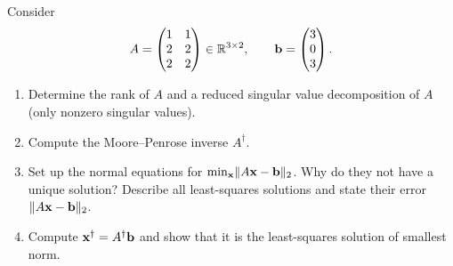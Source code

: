 
\renewcommand{\examletter}{D}

\makeheader

Consider
\[
A=\begin{pmatrix}1&1\\2&2\\2&2\end{pmatrix}\in\mathbb{R}^{3\times2},\qquad \mathbf{b}=\begin{pmatrix}3\\0\\3\end{pmatrix}.
\]
\begin{enumerate}
\item Determine the rank of $A$ and a reduced singular value decomposition of $A$ (only nonzero singular values).
\item Compute the Moore--Penrose inverse $A^\dagger$.
\item Set up the normal equations for $\min_{\mathbf{x}}\lVert A\mathbf{x}-\mathbf{b}\rVert_2$. Why do they not have a unique solution? Describe all least-squares solutions and state their error $\lVert A\mathbf{x}-\mathbf{b}\rVert_2$.
\item Compute $\mathbf{x}^\dagger=A^\dagger\mathbf{b}$ and show that it is the least-squares solution of smallest norm.
\end{enumerate}

